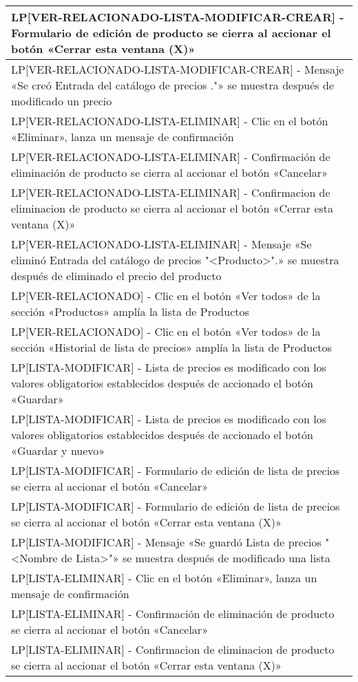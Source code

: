 \begin{longtable}{|p{15.0cm}|}
LP[VER-RELACIONADO-LISTA-MODIFICAR-CREAR] - Formulario de edición de producto se cierra al accionar el botón «Cerrar esta ventana (X)» \\ \hline
LP[VER-RELACIONADO-LISTA-MODIFICAR-CREAR] - Mensaje «Se creó Entrada del catálogo de precios ."» se muestra después de modificado un precio \\ \hline
LP[VER-RELACIONADO-LISTA-ELIMINAR] - Clic en el botón «Eliminar», lanza un mensaje de confirmación \\ \hline
LP[VER-RELACIONADO-LISTA-ELIMINAR] - Confirmación de eliminación de producto se cierra al accionar el botón «Cancelar» \\ \hline
LP[VER-RELACIONADO-LISTA-ELIMINAR] - Confirmacion de eliminacion de producto se cierra al accionar el botón «Cerrar esta ventana (X)» \\ \hline
LP[VER-RELACIONADO-LISTA-ELIMINAR] - Mensaje «Se eliminó Entrada del catálogo de precios "<Producto>".» se muestra después de eliminado el precio del producto \\ \hline
LP[VER-RELACIONADO] - Clic en el botón «Ver todos» de la sección «Productos» amplía la lista de Productos \\ \hline
LP[VER-RELACIONADO] - Clic en el botón «Ver todos» de la sección «Historial de lista de precios» amplía la lista de Productos \\ \hline
LP[LISTA-MODIFICAR] - Lista de precios es modificado con los valores obligatorios establecidos después de accionado el botón «Guardar» \\ \hline
LP[LISTA-MODIFICAR] - Lista de precios es modificado con los valores obligatorios establecidos después de accionado el botón «Guardar y nuevo» \\ \hline
LP[LISTA-MODIFICAR] - Formulario de edición de lista de precios se cierra al accionar el botón «Cancelar» \\ \hline
LP[LISTA-MODIFICAR] - Formulario de edición de lista de precios se cierra al accionar el botón «Cerrar esta ventana (X)» \\ \hline
LP[LISTA-MODIFICAR] - Mensaje «Se guardó Lista de precios "<Nombre de Lista>"» se muestra después de modificado una lista \\ \hline
LP[LISTA-ELIMINAR] - Clic en el botón «Eliminar», lanza un mensaje de confirmación \\ \hline
LP[LISTA-ELIMINAR] - Confirmación de eliminación de producto se cierra al accionar el botón «Cancelar» \\ \hline
LP[LISTA-ELIMINAR] - Confirmacion de eliminacion de producto se cierra al accionar el botón «Cerrar esta ventana (X)» \\ \hline

\end{longtable}
